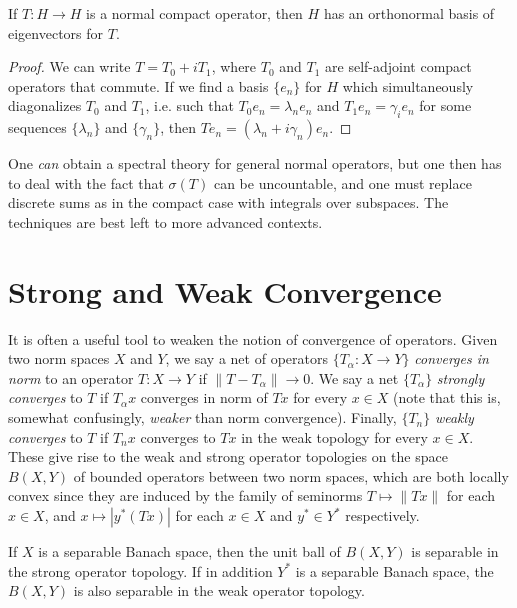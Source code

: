 \begin{corollary}
    If $T: H \to H$ is a normal compact operator, then $H$ has an orthonormal basis of eigenvectors for $T$.
\end{corollary}
\begin{proof}
    We can write $T = T_0 + i T_1$, where $T_0$ and $T_1$ are self-adjoint compact operators that commute. If we find a basis $\{ e_n \}$ for $H$ which simultaneously diagonalizes $T_0$ and $T_1$, i.e. such that $T_0e_n = \lambda_n e_n$ and $T_1 e_n= \gamma_i e_n$ for some sequences $\{ \lambda_n \}$ and $\{ \gamma_n \}$, then $Te_n = (\lambda_n + i \gamma_n) e_n$.
\end{proof}

\begin{remark}
    One \emph{can} obtain a spectral theory for general normal operators, but one then has to deal with the fact that $\sigma(T)$ can be uncountable, and one must replace discrete sums as in the compact case with integrals over subspaces. The techniques are best left to more advanced contexts.
\end{remark}









\section{Strong and Weak Convergence}

It is often a useful tool to weaken the notion of convergence of operators. Given two norm spaces $X$ and $Y$, we say a net of operators $\{ T_\alpha : X \to Y \}$ \emph{converges in norm} to an operator $T: X \to Y$ if $\| T - T_\alpha \| \to 0$. We say a net $\{ T_\alpha \}$ \emph{strongly converges} to $T$ if $T_\alpha x$ converges in norm of $Tx$ for every $x \in X$ (note that this is, somewhat confusingly, \emph{weaker} than norm convergence). Finally, $\{ T_n \}$ \emph{weakly converges} to $T$ if $T_n x$ converges to $Tx$ in the weak topology for every $x \in X$. These give rise to the weak and strong operator topologies on the space $B(X,Y)$ of bounded operators between two norm spaces, which are both locally convex since they are induced by the family of seminorms $T \mapsto \| Tx \|$ for each $x \in X$, and $x \mapsto |y^*(Tx)|$ for each $x \in X$ and $y^* \in Y^*$ respectively.

If $X$ is a separable Banach space, then the unit ball of $B(X,Y)$ is separable in the strong operator topology. If in addition $Y^*$ is a separable Banach space, the $B(X,Y)$ is also separable in the weak operator topology.

